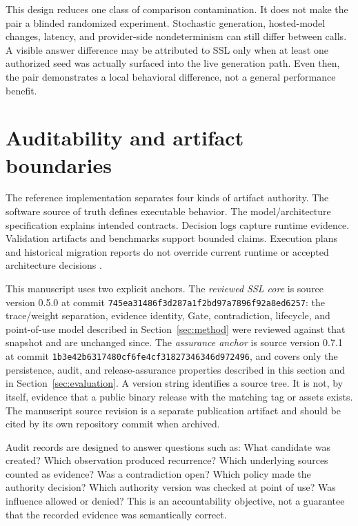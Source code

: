 \documentclass[11pt]{article}
\newcommand{\implcommit}{\nolinkurl{745ea31486f3d287a1f2bd97a7896f92a8ed6257}}
\newcommand{\sourceversion}{0.5.0}
\newcommand{\assurancecommit}{\nolinkurl{1b3e42b6317480cf6fe4cf31827346346d972496}}
\newcommand{\assuranceversion}{0.7.1}
\begin{document}
This design reduces one class of comparison contamination. It does not make the pair a blinded randomized experiment. Stochastic generation, hosted-model changes, latency, and provider-side nondeterminism can still differ between calls. A visible answer difference may be attributed to SSL only when at least one authorized seed was actually surfaced into the live generation path. Even then, the pair demonstrates a local behavioral difference, not a general performance benefit.

\section{Auditability and artifact boundaries}
\label{sec:audit}

The reference implementation separates four kinds of artifact authority. The software source of truth defines executable behavior. The model/architecture specification explains intended contracts. Decision logs capture runtime evidence. Validation artifacts and benchmarks support bounded claims. Execution plans and historical migration reports do not override current runtime or accepted architecture decisions \citep{shadowseed2026}.

This manuscript uses two explicit anchors. The \emph{reviewed SSL core} is source version \sourceversion{} at commit \implcommit{}: the trace/weight separation, evidence identity, Gate, contradiction, lifecycle, and point-of-use model described in Section~\ref{sec:method} were reviewed against that snapshot and are unchanged since. The \emph{assurance anchor} is source version \assuranceversion{} at commit \assurancecommit{}, and covers only the persistence, audit, and release-assurance properties described in this section and in Section~\ref{sec:evaluation}. A version string identifies a source tree. It is not, by itself, evidence that a public binary release with the matching tag or assets exists. The manuscript source revision is a separate publication artifact and should be cited by its own repository commit when archived.

Audit records are designed to answer questions such as: What candidate was created? Which observation produced recurrence? Which underlying sources counted as evidence? Was a contradiction open? Which policy made the authority decision? Which authority version was checked at point of use? Was influence allowed or denied? This is an accountability objective, not a guarantee that the recorded evidence was semantically correct.
\end{document}
